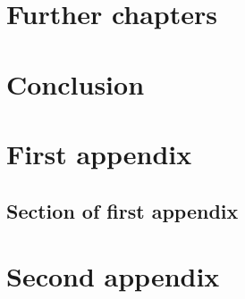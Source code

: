 \documentclass{mproj}
\begin{document}
\chapter{Further chapters}


\chapter{Conclusion}\label{conclusion}

\appendix %
\chapter{First appendix}

\section{Section of first appendix}

\chapter{Second appendix}



\end{document}
